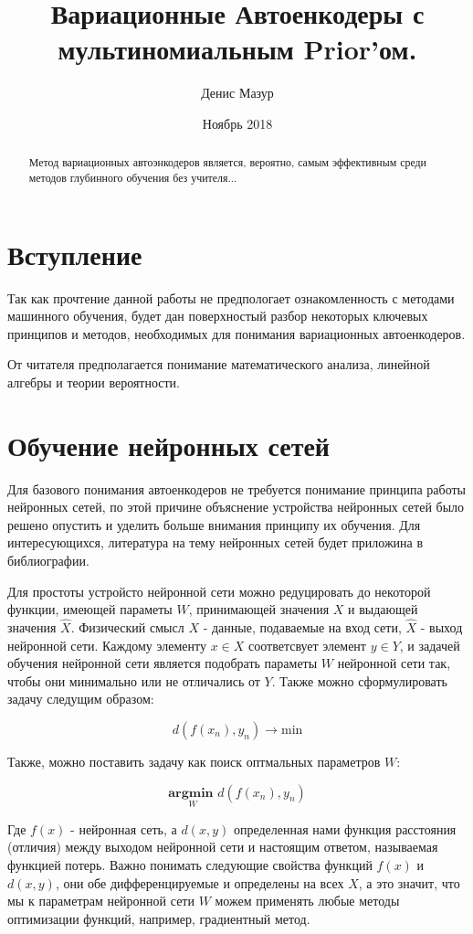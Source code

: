 \documentclass{article}
\title{Вариационные Автоенкодеры с мультиномиальным Prior'ом.}
\author{Денис Мазур}
\date{Ноябрь 2018}
\begin{document}
\maketitle

\begin{abstract}
    Метод вариационных автоэнкодеров является, вероятно, самым эффективным
    среди методов глубинного обучения без учителя...
\end{abstract}

\tableofcontents

\section{Вступление}
Так как прочтение данной работы не предпологает ознакомленность с методами машинного обучения, будет дан поверхностый разбор некоторых ключевых принципов и методов,
необходимых для понимания вариационных автоенкодеров. 

От читателя предполагается понимание математического анализа, линейной алгебры и теории вероятности.

\section{Обучение нейронных сетей}
Для базового понимания автоенкодеров не требуется понимание принципа работы нейронных сетей, по этой причине объяснение устройства нейронных сетей было решено опустить 
и уделить больше внимания принципу их обучения. Для интересующихся, литература на тему нейронных сетей будет приложина в библиографии.

Для простоты устройсто нейронной сети можно редуцировать до некоторой функции, имеющей параметы $W$, принимающей значения $X$ и выдающей значения $\widehat{X}$. 
Физический смысл $X$ - данные, подаваемые на вход сети, $\widehat{X}$ - выход нейронной сети. Каждому элементу $x \in X$ соответсвует элемент $y \in Y$, и задачей обучения
нейронной сети является подобрать параметы $W$ нейронной сети так, чтобы они минимально или не отличались от $Y$. Также можно сформулировать задачу следущим образом:

$$d(f(x_n), y_n) \rightarrow \text{min}$$

Также, можно поставить задачу как поиск оптмальных параметров $W$:

$$\underset{W}{\textbf{argmin }} d(f(x_n), y_n)$$ 

Где $f(x)$ - нейронная сеть, а $d(x, y)$ определенная нами функция расстояния (отличия) между выходом нейронной сети и настоящим ответом, называемая функцией потерь.
Важно понимать следующие свойства функций $f(x)$ и $d(x, y)$, они обе дифференцируемые и определены на всех $X$, а это значит, что мы к параметрам нейронной сети $W$ можем
применять любые методы оптимизации функций, например, градиентный метод.
\end{document}
